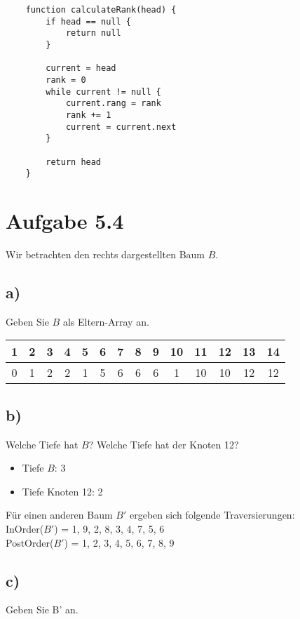 \documentclass[a4paper]{article}
\begin{document}
\begin{verbatim}
    function calculateRank(head) {
        if head == null {
            return null
        }
    
        current = head
        rank = 0
        while current != null {
            current.rang = rank
            rank += 1
            current = current.next
        }
        
        return head
    }
\end{verbatim}

\break

\section*{Aufgabe 5.4}
Wir betrachten den rechts dargestellten Baum $B$.
\subsection*{a)}
Geben Sie $B$ als Eltern-Array an.\\

\begin{tabular}{| c | c | c | c | c | c | c | c | c | c | c | c | c | c |}
    \hline
    1 & 2 & 3 & 4 & 5 & 6 & 7 & 8 & 9 & 10 & 11 & 12 & 13 & 14 \\
    \hline
    0 & 1 & 2 & 2 & 1 & 5 & 6 & 6 & 6 & 1 & 10 & 10 & 12 & 12 \\
    \hline
\end{tabular}

\subsection*{b)}
Welche Tiefe hat $B$? Welche Tiefe hat der Knoten 12?

\begin{itemize}
    \item Tiefe $B$: 3
    \item Tiefe Knoten 12: 2
\end{itemize}

Für einen anderen Baum $B'$ ergeben sich folgende Traversierungen:\\
InOrder($B'$) = 1, 9, 2, 8, 3, 4, 7, 5, 6\\
PostOrder($B'$) = 1, 2, 3, 4, 5, 6, 7, 8, 9

\subsection*{c)}
Geben Sie B' an.\\

\end{document}
